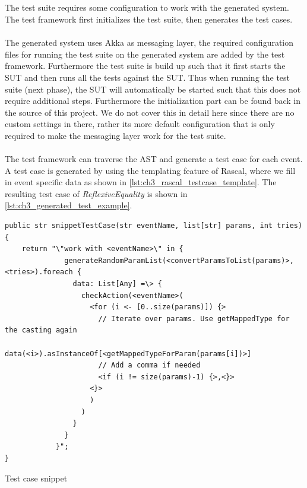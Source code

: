 \subsection{\tfPhaseFour{}}
\label{sct:3_tf_phase_four}
The test suite requires some configuration to work with the generated system. The test framework first initializes the test suite, then generates the test cases.\\
\\
The generated system uses Akka as messaging layer, the required configuration files for running the test suite on the generated system are added by the test framework. Furthermore the test suite is build up such that it first starts the SUT and then runs all the tests against the SUT. Thus when running the test suite (next phase), the SUT will automatically be started such that this does not require additional steps. Furthermore the initialization part can be found back in the source of this project. We do not cover this in detail here since there are no custom settings in there, rather its more default configuration that is only required to make the messaging layer work for the test suite.\\
\\
The test framework can traverse the AST and generate a test case for each event. A test case is generated by using the templating feature of Rascal, where we fill in event specific data as shown in \autoref{lst:ch3_rascal_testcase_template}. The resulting test case of \textit{ReflexiveEquality} is shown in \autoref{lst:ch3_generated_test_example}.
\FloatBarrier
\begin{sourcecode}[h!]
\begin{lstlisting}[language=Rascal]
public str snippetTestCase(str eventName, list[str] params, int tries) {
	return "\"work with <eventName>\" in {
	          generateRandomParamList(<convertParamsToList(params)>, <tries>).foreach {
	            data: List[Any] =\> {
	              checkAction(<eventName>(
	       	        <for (i <- [0..size(params)]) {>
                      // Iterate over params. Use getMappedType for the casting again
                      data(<i>).asInstanceOf[<getMappedTypeForParam(params[i])>]
                      // Add a comma if needed
                      <if (i != size(params)-1) {>,<}>
                    <}>
	                )
	              )
	            }
	          }
	        }";
}
\end{lstlisting}
\caption{Test case snippet}
\label{lst:ch3_rascal_testcase_template}
\end{sourcecode}
\FloatBarrier

